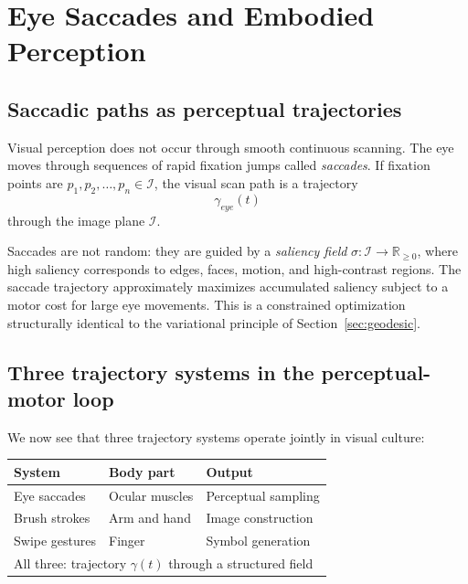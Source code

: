 \documentclass[12pt,a4paper]{article}
\theoremstyle{plain}
\theoremstyle{definition}
\begin{document}
\section{Eye Saccades and Embodied Perception}
\label{sec:saccades}

\subsection{Saccadic paths as perceptual trajectories}

Visual perception does not occur through smooth continuous scanning. The eye
moves through sequences of rapid fixation jumps called \emph{saccades}. If
fixation points are $p_1, p_2, \dots, p_n \in \mathcal{I}$, the visual scan
path is a trajectory
\[
\gamma_{eye}(t)
\]
through the image plane $\mathcal{I}$.

Saccades are not random: they are guided by a \emph{saliency field}
$\sigma:\mathcal{I}\to\mathbb{R}_{\geq 0}$, where high saliency corresponds to
edges, faces, motion, and high-contrast regions. The saccade trajectory
approximately maximizes accumulated saliency subject to a motor cost for large
eye movements. This is a constrained optimization structurally identical to the
variational principle of Section~\ref{sec:geodesic}.

\subsection{Three trajectory systems in the perceptual-motor loop}

We now see that three trajectory systems operate jointly in visual culture:

\begin{center}
\begin{tabular}{lll}
\toprule
\textbf{System} & \textbf{Body part} & \textbf{Output} \\
\midrule
Eye saccades   & Ocular muscles  & Perceptual sampling \\
Brush strokes  & Arm and hand    & Image construction \\
Swipe gestures & Finger          & Symbol generation \\
\midrule
\multicolumn{3}{l}{All three: trajectory $\gamma(t)$ through a structured field} \\
\bottomrule
\end{tabular}
\end{center}
\end{document}
